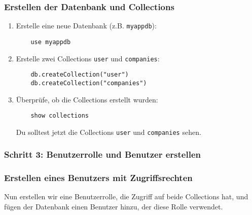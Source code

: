 \documentclass[a4paper,12pt]{article}
\begin{document}
\subsubsection{Erstellen der Datenbank und Collections}
\begin{enumerate}
    \item Erstelle eine neue Datenbank (z.B. \texttt{myappdb}):

    \begin{lstlisting}
    use myappdb
    \end{lstlisting}
    
    \item Erstelle zwei Collections \texttt{user} und \texttt{companies}:

    \begin{lstlisting}
    db.createCollection("user")
    db.createCollection("companies")
    \end{lstlisting}
    
    \item Überprüfe, ob die Collections erstellt wurden:

    \begin{lstlisting}
    show collections
    \end{lstlisting}
    
    Du solltest jetzt die Collections \texttt{user} und \texttt{companies} sehen.
\end{enumerate}

\subsubsection{Schritt 3: Benutzerrolle und Benutzer erstellen}

\subsubsection{Erstellen eines Benutzers mit Zugriffsrechten}
Nun erstellen wir eine Benutzerrolle, die Zugriff auf beide Collections hat, und fügen der Datenbank einen Benutzer hinzu, der diese Rolle verwendet.
\end{document}
